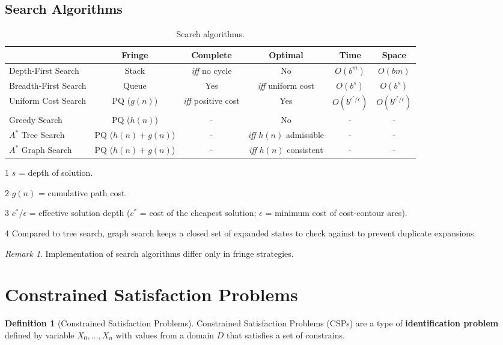 \documentclass[11pt]{article}
\theoremstyle{definition}
\newtheorem{definition}{Definition}[section]
\theoremstyle{remark}
\newtheorem*{remark}{Remark}
\begin{document}
\subsection{Search Algorithms}
\begin{table}[ht]
\centering
\begin{adjustbox}{width={\textwidth}}
\begin{threeparttable}
\caption{Search algorithms.}
\begin{tabular}[t]{lccccc}
\hline
& Fringe & Complete & Optimal & Time & Space \\ 
\hline
Depth-First Search & Stack & \textit{iff} no cycle & No & $O(b^m)$ & $O(bm)$ \\ 
Breadth-First Search & Queue & Yes & \textit{iff} uniform cost & $O(b^s)$\tnote{1} & $O(b^s)$\tnote{1} \\ 
Uniform Cost Search & PQ ($g(n)$)\tnote{2} & \textit{iff} positive cost & Yes & $O(b^{c^*/\epsilon})$\tnote{3} & $O(b^{c^*/\epsilon})$\tnote{3} \\ 
Greedy Search & PQ ($h(n)$)& - & No & - & - \\ 
$A^*$ Tree Search & PQ ($h(n)+g(n)$)& - & \textit{iff} $h(n)$ admissible & - & - \\ 
$A^*$ Graph Search\tnote{4} & PQ ($h(n)+g(n)$) & - & \textit{iff} $h(n)$ consistent & - & - \\ 
\hline
\end{tabular}
\quad
\begin{tablenotes}\footnotesize
\item[1] $s$ = depth of solution.
\item[2] $g(n)$ = cumulative path cost.
\item[3] $c^*/\epsilon$ = effective solution depth ($c^*$ = cost of the cheapest solution; $\epsilon$ = minimum cost of cost-contour arcs).
\item[4] Compared to tree search, graph search keeps a closed set of expanded states to check against to prevent duplicate expansions.
\end{tablenotes}
\end{threeparttable}
\end{adjustbox}
\end{table}

\begin{remark}
Implementation of search algorithms differ only in fringe strategies.
\end{remark}
\clearpage

\section{Constrained Satisfaction Problems}
\begin{definition}[Constrained Satisfaction Problems]
Constrained Satisfaction Problems (CSPs) are a type of \textbf{identification problem} defined by variable $X_0, \dots, X_n$ with values from a domain $D$ that satisfies a set of constrains.
\end{definition}
\end{document}
